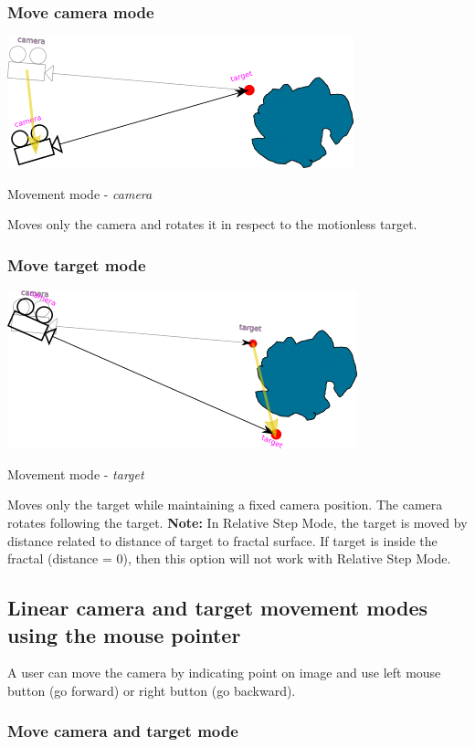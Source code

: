 \subsubsection{Move camera mode}\label{move-camera-mode}
\nopagebreak

\includegraphics[width=0.5\linewidth]{img/manual/media/move_only_camera}
\nopagebreak

Movement mode - \textit{camera}
\nopagebreak

Moves only the camera and rotates it in respect to the motionless target.

\subsubsection{Move target mode}\label{move-target-mode}
\nopagebreak

\includegraphics[width=0.5\linewidth]{img/manual/media/move_target}
\nopagebreak

Movement mode - \emph{target}
\nopagebreak

Moves only the target while maintaining a fixed camera position. The camera
rotates following the target. \textbf{Note:} In Relative Step Mode, the target
is moved by distance related to distance of target to fractal surface. If target
is inside the fractal (distance = 0), then this option will not work with
Relative Step Mode.

\subsection{Linear camera and target movement modes using the mouse
	pointer}\label{linear-camera-and-target-movement-modes-using-the-mouse-pointer}

A user can move the camera by indicating point on image and use left mouse
button (go forward) or right button (go backward).


\subsubsection{Move camera and target mode}\label{move-camera-and-target-mode-1}

